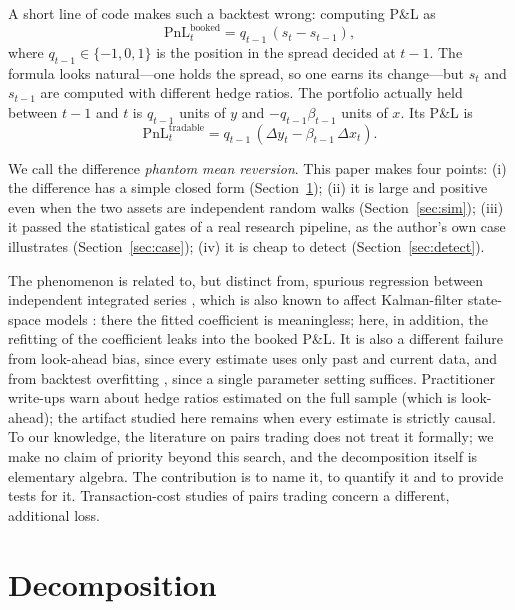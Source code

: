 \documentclass[11pt]{article}
\theoremstyle{remark}
\begin{document}
A short line of code makes such a backtest wrong: computing P\&L as
\begin{equation}
\text{PnL}_t^{\text{booked}} = q_{t-1}\,(s_t - s_{t-1}),
\label{eq:booked}
\end{equation}
where $q_{t-1}\in\{-1,0,1\}$ is the position in the spread decided at $t-1$. The formula looks natural---one
holds the spread, so one earns its change---but $s_t$ and $s_{t-1}$ are computed with different hedge ratios. The
portfolio actually held between $t-1$ and $t$ is $q_{t-1}$ units of $y$ and $-q_{t-1}\beta_{t-1}$ units of $x$. Its
P\&L is
\begin{equation}
\text{PnL}_t^{\text{tradable}} = q_{t-1}\,(\Delta y_t - \beta_{t-1}\,\Delta x_t).
\label{eq:tradable}
\end{equation}

We call the difference \emph{phantom mean reversion}. This paper makes four points: (i) the difference has a
simple closed form (Section~\ref{sec:decomp}); (ii) it is large and positive even when the two assets are
independent random walks (Section~\ref{sec:sim}); (iii) it passed the statistical gates of a real research pipeline, as the author's own case illustrates (Section~\ref{sec:case}); (iv) it is cheap to detect (Section~\ref{sec:detect}).

The phenomenon is related to, but distinct from, spurious regression between independent integrated series
\cite{granger1974,phillips1986}, which is also known to affect Kalman-filter state-space models \cite{eroglu2022}: there the fitted coefficient is meaningless; here, in addition, the refitting of
the coefficient leaks into the booked P\&L. It is also a different failure from look-ahead bias, since every
estimate uses only past and current data, and from backtest overfitting \cite{bailey2017pbo,bailey2014dsr},
since a single parameter setting suffices. Practitioner write-ups warn about hedge ratios estimated on the full sample
(which is look-ahead); the artifact studied here remains when every estimate is strictly causal. To our knowledge, the literature on pairs trading does not treat it formally; we make no claim of priority beyond
this search, and the decomposition itself is elementary algebra. The contribution is to name it, to quantify it and to
provide tests for it. Transaction-cost studies of pairs trading \cite{doFaff2012} concern a different, additional loss.

\section{Decomposition}
\label{sec:decomp}
\end{document}
